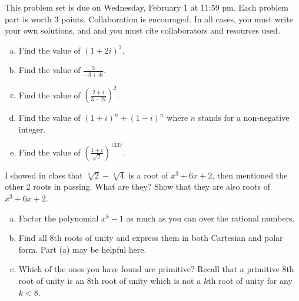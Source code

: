 \maketitle

This problem set is due on Wednesday, February 1 at 11:59 pm. Each problem part is worth 3 points. Collaboration is encouraged. In all cases, you must write your own solutions, and and you must cite collaborators and resources used.

\begin{problem}
    \leavevmode\begin{enumerate}[(a)]
      \item Find the value of $(1+2i)^3$.
      \item Find the value of $\frac 5{-3+4i}$.
      \item Find the value of $\left(\frac{2+i}{3-2i}\right)^2$.
      \item Find the value of $(1+i)^n+(1-i)^n$ where $n$ stands for a non-negative integer.
      \item Find the value of $\left(\frac{1+i}{\sqrt2}\right)^{1337}$.
    \end{enumerate}
\end{problem}
\begin{solution}
  
\end{solution}


\begin{problem}
  I showed in class that $\sqrt[3]2-\sqrt[3]4$ is a root of $x^3+6x+2$, then mentioned the other 2 roots in passing. What are they? Show that they are also roots of $x^3+6x+2$.
\end{problem}

\begin{problem}
  \leavevmode\begin{enumerate}[(a)]
    \item Factor the polynomial $x^8-1$ as much as you can over the rational numbers.
    \item Find all 8th roots of unity and express them in both Cartesian and polar form. Part (a) may be helpful here.
    \item Which of the ones you have found are primitive? Recall that a primitive 8th root of unity is an 8th root of unity which is not a $k$th root of unity for any $k<8$.
  \end{enumerate}
\end{problem}


